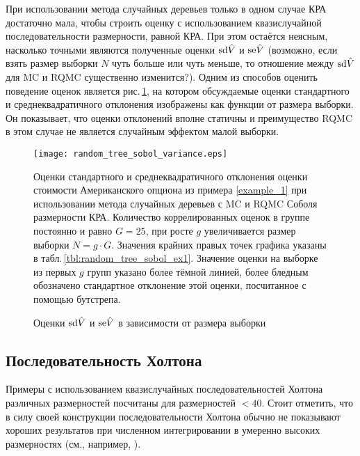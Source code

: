 При использовании метода случайных деревьев только в одном случае КРА достаточно мала, чтобы строить оценку с использованием квазислучайной последовательности размерности, равной КРА. При этом остаётся неясным, насколько точными являются полученные оценки $\mathrm{sd}\hat{V}$ и $\mathrm{se}\hat{V}$ (возможно, если взять размер выборки $N$ чуть больше или чуть меньше, то отношение между $\mathrm{sd}\hat{V}$ для MC и RQMC существенно изменится?). Одним из способов оценить поведение оценок является рис.\,\ref{fig:random_tree_sobol_variance}, на котором обсуждаемые оценки стандартного и среднеквадратичного отклонения изображены как функции от размера выборки. Он показывает, что оценки отклонений вполне статичны и преимущество RQMC в этом случае не является случайным эффектом малой выборки.

\begin{figure}[h!bt]
    \centering
    \texttt{[image: random\_tree\_sobol\_variance.eps]}
    \caption{Оценки $\mathrm{sd}\hat{V}$ и $\mathrm{se}\hat{V}$ в зависимости от размера выборки}
    \label{fig:random_tree_sobol_variance}
    \footnotesize
    Оценки стандартного и среднеквадратичного отклонения оценки стоимости Американского опциона из примера \ref{example_1} при использовании метода случайных деревьев с MC и RQMC Соболя размерности КРА. Количество коррелированных оценок в группе постоянно и равно $G=25$, при росте $g$ увеличивается размер выборки $N=g\cdot G$. Значения крайних правых точек графика указаны в табл.\,\ref{tbl:random_tree_sobol_ex1}. Значение оценки на выборке из первых $g$ групп указано более тёмной линией, более бледным обозначено стандартное отклонение этой оценки, посчитанное с помощью бутстрепа.
\end{figure}



\subsection{Последовательность Холтона} %
\label{sub:results:qmc_to_classical:halton}

Примеры с использованием квазислучайных последовательностей Холтона различных размерностей посчитаны для размерностей $< 40$. Стоит отметить, что в силу своей конструкции последовательности Холтона обычно не показывают хороших результатов при численном интегрировании в умеренно высоких размерностях (см., например, \cite{Faure2009}).

